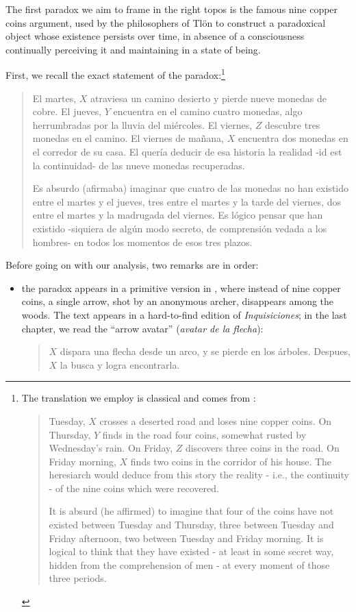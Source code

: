 The first paradox we aim to frame in the right topos is the famous nine copper coins argument, used by the philosophers of Tlön to construct a paradoxical object whose existence persists over time, in absence of a consciousness continually perceiving it and maintaining in a state of being.
\begin{example}\label{bla}
	First, we recall the exact statement of the paradox:\footnote{The translation we employ is classical and comes from \cite{tlonEN}:
		\begin{quote}
			\hspace{.5em} Tuesday, $X$ crosses a deserted road and loses nine copper coins. On Thursday, $Y$ finds in the road four coins, somewhat rusted by Wednesday's rain. On Friday, $Z$ discovers three coins in the road. On Friday morning, $X$ finds two coins in the corridor of his house. The heresiarch would deduce from this story the reality - i.e., the continuity - of the nine coins which were recovered.

			\hspace{.5em} It is absurd (he affirmed) to imagine that four of the coins have not existed between Tuesday and Thursday, three between Tuesday and Friday afternoon, two between Tuesday and Friday morning. It is logical to think that they have existed - at least in some secret way, hidden from the comprehension of men - at every moment of those three periods.
		\end{quote}}
	\begin{quote}
		El martes, $X$ atraviesa un camino desierto y pierde nueve monedas de cobre.
		El jueves, $Y$ encuentra en el camino cuatro monedas, algo herrumbradas por la lluvia del miércoles. El viernes, $Z$ descubre tres monedas en el camino. El viernes de mañana, $X$ encuentra dos monedas en el corredor de su casa. El  quería deducir de esa historia la realidad -id est la continuidad- de las nueve monedas recuperadas.

		Es absurdo (afirmaba) imaginar que cuatro de las monedas no han existido entre el martes y el jueves, tres entre el martes y la tarde del viernes, dos entre el martes y la madrugada del viernes. Es lógico pensar que han existido -siquiera de algún modo secreto, de comprensión vedada a los hombres- en todos los momentos de esos tres plazos.
	\end{quote}
	Before going on with our analysis, two remarks are in order:
	\begin{itemize}
		\item the paradox appears in a primitive version in \cite{borges1997otras}, where instead of nine copper coins, a single arrow, shot by an anonymous archer, disappears among the woods. The text appears in a hard-to-find edition of \emph{Inquisiciones}; in the last chapter, we read the ``arrow avatar'' (\emph{avatar de la flecha}):
		      \begin{quote}
						$X$ dispara una flecha desde un arco, y se pierde en los árboles. Despues, $X$ la busca y logra encontrarla.


\end{quote}
\end{itemize}
\end{example}
